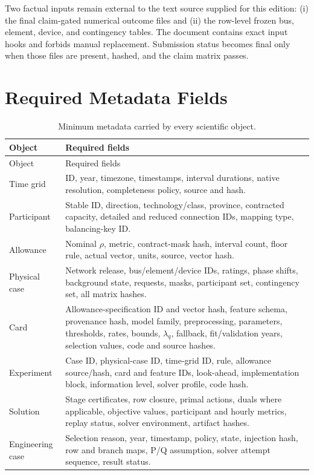 \documentclass[10pt,journal,onecolumn]{IEEEtran}
\begin{document}
Two factual inputs remain external to the text source supplied for this edition:
(i) the final claim-gated numerical outcome files and (ii) the row-level frozen
bus, element, device, and contingency tables. The document contains exact input
hooks and forbids manual replacement. Submission status becomes final only when
those files are present, hashed, and the claim matrix passes.

\begin{center}
\end{center}

\appendices

\section{Required Metadata Fields}
\label{app:metadata}

\begin{longtable}{@{}p{}p{}@{}}
\caption{Minimum metadata carried by every scientific object.}\\
\toprule
Object & Required fields \\
\midrule
\endfirsthead
\toprule
Object & Required fields \\
\midrule
\endhead
Time grid & ID, year, timezone, timestamps, interval durations, native resolution, completeness policy, source and hash. \\
Participant & Stable ID, direction, technology/class, province, contracted capacity, detailed and reduced connection IDs, mapping type, balancing-key ID. \\
Allowance & Nominal $\rho$, metric, contract-mask hash, interval count, floor rule, actual vector, units, source, vector hash. \\
Physical case & Network release, bus/element/device IDs, ratings, phase shifts, background state, requests, masks, participant set, contingency set, all matrix hashes. \\
Card & Allowance-specification ID and vector hash, feature schema, provenance hash, model family, preprocessing, parameters, thresholds, rates, bounds, $\lambda_q$, fallback, fit/validation years, selection values, code and source hashes. \\
Experiment & Case ID, physical-case ID, time-grid ID, rule, allowance source/hash, card and feature IDs, look-ahead, implementation block, information level, solver profile, code hash. \\
Solution & Stage certificates, row closure, primal actions, duals where applicable, objective values, participant and hourly metrics, replay status, solver environment, artifact hashes. \\
Engineering case & Selection reason, year, timestamp, policy, state, injection hash, row and branch maps, P/Q assumption, solver attempt sequence, result status. \\
\bottomrule
\end{longtable}
\end{document}
